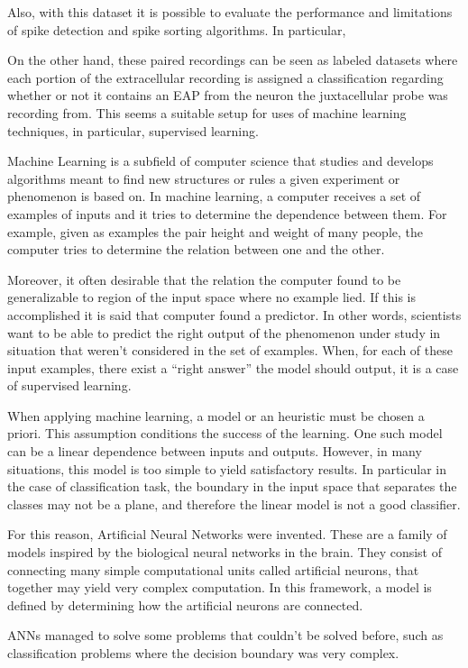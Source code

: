 Also, with this dataset it is possible to evaluate the performance and limitations of spike detection and spike sorting algorithms. In particular, 

On the other hand, these paired recordings can be seen as labeled datasets where each portion of the extracellular recording is assigned a classification regarding whether or not it contains an EAP from the neuron the juxtacellular probe was recording from. This seems a suitable setup for uses of machine learning techniques, in particular, supervised learning.

Machine Learning is a subfield of computer science that studies and develops algorithms meant to find new structures or rules a given experiment or phenomenon is based on. In machine learning, a computer receives a set of examples of inputs and it tries to determine the dependence between them. For example, given as examples the pair height and weight of many people, the computer tries to determine the relation between one and the other. 
 
Moreover, it often desirable that the relation the computer found to be generalizable to region of the input space where no example lied. If this is accomplished it is said that computer found a predictor. In other words, scientists want to be able to predict the right output of the phenomenon under study in situation that weren't considered in the set of examples. 
When, for each of these input examples, there exist a “right answer” the model should output, it is a case of supervised learning.

When applying machine learning, a model or an heuristic must be chosen a priori. This assumption conditions the success of the learning. One such model can be a linear dependence between inputs and outputs. However, in many situations, this model is too simple to yield satisfactory results. In particular in the case of classification task, the boundary in the input space that separates the  classes may not be a plane, and therefore the linear model is not a good classifier.

For this reason, Artificial Neural Networks were invented. These are a family of models inspired by the biological neural networks in the brain. They consist of connecting many simple computational units called artificial neurons, that together may yield very complex computation. In this framework, a model is defined by determining how the artificial neurons are connected. 

ANNs managed to solve some problems that couldn't be solved before, such as classification problems where the decision boundary was very complex.

